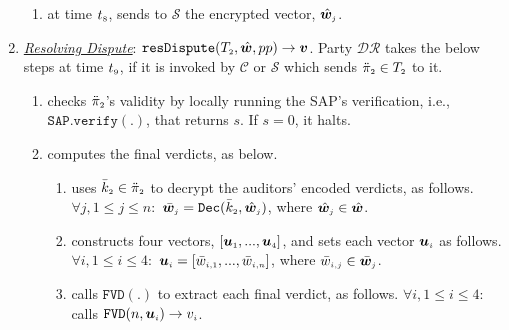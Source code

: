 \begin{enumerate}[leftmargin=.46cm]
\begin{enumerate}
\item at time $t_{\scriptscriptstyle 8}$, sends to $\mathcal S$ the encrypted vector, $\hat {\bm w}_{\scriptscriptstyle j}$. %
\end{enumerate}



\item\label{DR::DisputeResolution}  \underline{\textit{Resolving Dispute}}: $\mathtt{resDispute}(T_{\scriptscriptstyle 2}, \hat {\bm w}, pp)\rightarrow \bm v$.
%
 Party $\mathcal{DR}$ takes the below steps at time $t_{\scriptscriptstyle 9}$, if it is invoked by $\mathcal{C}$ or  $\mathcal{S}$ which sends $\ddot\pi_{\scriptscriptstyle 2}\in T_{\scriptscriptstyle 2}$ to it.

\begin{enumerate}
%
\item checks $\ddot{\pi}_{\scriptscriptstyle 2}$'s validity by locally running  the SAP's verification, i.e., $\mathtt{SAP.verify}(.)$, that  returns  $s$. If $s=0$, it halts. %
%
%
%

\item computes the final verdicts, as below. 
%
\begin{enumerate}
%
\item uses $\bar k_{\scriptscriptstyle 2}\in \ddot \pi_{\scriptscriptstyle 2}$ to decrypt the auditors' encoded verdicts, as follows. $ \forall j, 1\leq j \leq n:$
%
$ \bar {\bm w}_{\scriptscriptstyle j}= \mathtt{Dec}(\bar k_{\scriptscriptstyle 2}, \hat{\bm w}_{\scriptscriptstyle j})$, where $\hat{\bm w}_{\scriptscriptstyle j}\in \hat{\bm w}$.
 \item constructs four vectors, $[\bm u_{\scriptscriptstyle 1},...,\bm u_{\scriptscriptstyle 4}]$, and sets  each vector $\bm u_{\scriptscriptstyle i}$ as follows. $\forall i, 1\leq i \leq 4:$
  $\bm u_{\scriptscriptstyle i}=[\bar{w}_{\scriptscriptstyle i,1},...,\bar{w}_{\scriptscriptstyle i,n}]$, where $\bar{w}_{\scriptscriptstyle i,j}\in \bar {\bm w}_{\scriptscriptstyle j}$. 
%
\item calls $\mathtt{FVD}(.)$ to extract each final verdict, as follows. $\forall i, 1\leq i \leq 4:$ calls $\mathtt{FVD}(n,  {\bm u}_{\scriptscriptstyle i})\rightarrow  v_{\scriptscriptstyle i}$. 



\end{enumerate}
\end{enumerate}
\end{enumerate}
